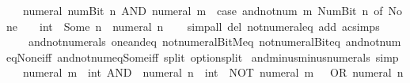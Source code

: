 \begin{isabellebody}
\ \ {\isacartoucheopen}{\isacharminus}{\kern0pt}\ {\isacharparenleft}{\kern0pt}numeral\ {\isacharparenleft}{\kern0pt}num{\isachardot}{\kern0pt}Bit{}\ n{\isacharparenright}{\kern0pt}{\isacharparenright}{\kern0pt}\ AND\ numeral\ m\ {\isacharequal}{\kern0pt}\ {\isacharparenleft}{\kern0pt}case\ and{\isacharunderscore}{\kern0pt}not{\isacharunderscore}{\kern0pt}num\ m\ {\isacharparenleft}{\kern0pt}Num{\isachardot}{\kern0pt}Bit{}\ n{\isacharparenright}{\kern0pt}\ of\ None\ {\isasymRightarrow}\ {}\ {\isacharcolon}{\kern0pt}{\isacharcolon}{\kern0pt}\ int\ {\isacharbar}{\kern0pt}\ Some\ n{\isacharprime}{\kern0pt}\ {\isasymRightarrow}\ numeral\ n{\isacharprime}{\kern0pt}{\isacharparenright}{\kern0pt}{\isacartoucheclose}\isanewline
%
\isadelimproof
\ \ %
\endisadelimproof
%
\isatagproof
{}\isamarkupfalse%
\ {\isacharparenleft}{\kern0pt}simp{\isacharunderscore}{\kern0pt}all\ del{\isacharcolon}{\kern0pt}\ not{\isacharunderscore}{\kern0pt}numeral{\isacharunderscore}{\kern0pt}eq\ add{\isacharcolon}{\kern0pt}\ ac{\isacharunderscore}{\kern0pt}simps\isanewline
\ \ \ \ and{\isacharunderscore}{\kern0pt}not{\isacharunderscore}{\kern0pt}numerals\ one{\isacharunderscore}{\kern0pt}and{\isacharunderscore}{\kern0pt}eq\ not{\isacharunderscore}{\kern0pt}numeral{\isacharunderscore}{\kern0pt}BitM{\isacharunderscore}{\kern0pt}eq\ not{\isacharunderscore}{\kern0pt}numeral{\isacharunderscore}{\kern0pt}Bit{}{\isacharunderscore}{\kern0pt}eq\ and{\isacharunderscore}{\kern0pt}not{\isacharunderscore}{\kern0pt}num{\isacharunderscore}{\kern0pt}eq{\isacharunderscore}{\kern0pt}None{\isacharunderscore}{\kern0pt}iff\ and{\isacharunderscore}{\kern0pt}not{\isacharunderscore}{\kern0pt}num{\isacharunderscore}{\kern0pt}eq{\isacharunderscore}{\kern0pt}Some{\isacharunderscore}{\kern0pt}iff\ split{\isacharcolon}{\kern0pt}\ option{\isachardot}{\kern0pt}split{\isacharparenright}{\kern0pt}%
\endisatagproof
{\isafoldproof}%
%
\isadelimproof
\isanewline
%
\endisadelimproof
\isanewline
{}\isamarkupfalse%
\ and{\isacharunderscore}{\kern0pt}minus{\isacharunderscore}{\kern0pt}minus{\isacharunderscore}{\kern0pt}numerals\ {\isacharbrackleft}{\kern0pt}simp{\isacharbrackright}{\kern0pt}{\isacharcolon}{\kern0pt}\isanewline
\ \ {\isacartoucheopen}{\isacharminus}{\kern0pt}\ {\isacharparenleft}{\kern0pt}numeral\ m\ {\isacharcolon}{\kern0pt}{\isacharcolon}{\kern0pt}\ int{\isacharparenright}{\kern0pt}\ AND\ {\isacharminus}{\kern0pt}\ {\isacharparenleft}{\kern0pt}numeral\ n\ {\isacharcolon}{\kern0pt}{\isacharcolon}{\kern0pt}\ int{\isacharparenright}{\kern0pt}\ {\isacharequal}{\kern0pt}\ NOT\ {\isacharparenleft}{\kern0pt}{\isacharparenleft}{\kern0pt}numeral\ m\ {\isacharminus}{\kern0pt}\ {}{\isacharparenright}{\kern0pt}\ OR\ {\isacharparenleft}{\kern0pt}numeral\ n\ {\isacharminus}{\kern0pt}\ {}{\isacharparenright}{\kern0pt}{\isacharparenright}{\kern0pt}{\isacartoucheclose}\isanewline

\end{isabellebody}
